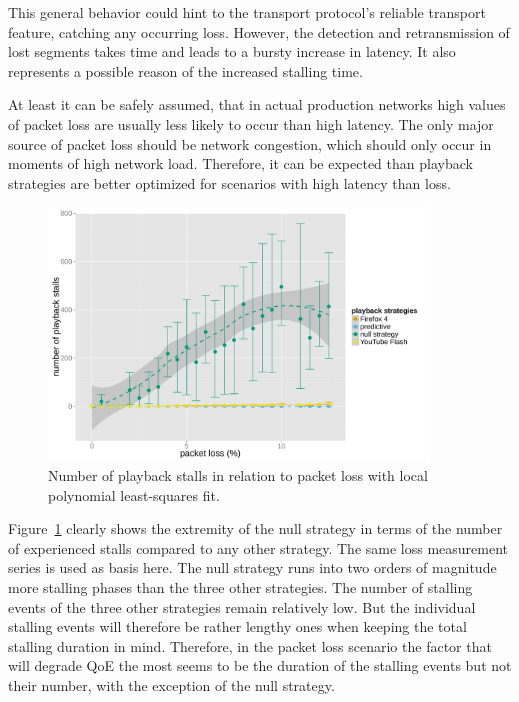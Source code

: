 This general behavior could hint to the transport protocol's reliable transport feature, catching any occurring loss. However, the detection and retransmission of lost segments takes time and leads to a bursty increase in latency. It also represents a possible reason of the increased stalling time. 

At least it can be safely assumed, that in actual production networks high values of packet loss are usually less likely to occur than high latency. The only major source of packet loss should be network congestion, which should only occur in moments of high network load. Therefore, it can be expected than playback strategies are better optimized for scenarios with high latency than loss.

\begin{figure}[htbp]
	\centering
	\includegraphics[width=0.9\textwidth]{images/R-playbackemulation-stallnumber-loss.pdf}
	\caption{Number of playback stalls in relation to packet loss with local polynomial least-squares fit.}
\label{c3:fig:eval-loss-numstalls}
\end{figure}

Figure~\ref{c3:fig:eval-loss-numstalls} clearly shows the extremity of the null strategy in terms of the number of experienced stalls compared to any other strategy. The same loss measurement series is used as basis here. The null strategy runs into two orders of magnitude more stalling phases than the three other strategies. The number of stalling events of the three other strategies remain relatively low. But the individual stalling events will therefore be rather lengthy ones when keeping the total stalling duration in mind. Therefore, in the packet loss scenario the factor that will degrade \gls{QoE} the most seems to be the duration of the stalling events but not their number, with the exception of the null strategy.

